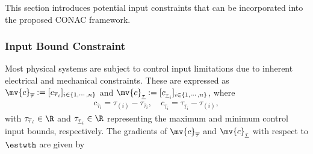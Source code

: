 \documentclass[letterpaper, journal]{IEEEtran}
\begin{document}
This section introduces potential input constraints that can be incorporated into the proposed CONAC framework.

\subsubsection{Input Bound Constraint}\label{sec:appen:cstr:input:bound}

Most physical systems are subject to control input limitations due to inherent electrical and mechanical constraints.
These are expressed as $\mv{c}_{\overline \tau}:= [c_{\overline \tau_i}]_{i\in\{1,\cdots,n\}}$ and $\mv{c}_{\underline\tau}:= [c_{\underline\tau_i}]_{i\in\{1,\cdots,n\}}$, where
\begin{equation}
    \begin{aligned}
        c_{\overline \tau_i}=\tau_{(i)} - {\tau_{\overline \tau_i}}
        ,
        \quad
        c_{\underline\tau_i}={\tau_{\underline\tau_i}}-\tau_{(i)}
        ,
    \end{aligned}
    \label{eq:cstr:input:bound}
\end{equation}
with $\tau_{\overline \tau_i}\in\R$ and $\tau_{\underline\tau_i}\in\R$ representing the maximum and minimum control input bounds, respectively.
The gradients of $\mv{c}_{\overline \tau}$ and $\mv{c}_{\underline\tau}$ with respect to $\estwth$ are given by
\end{document}

